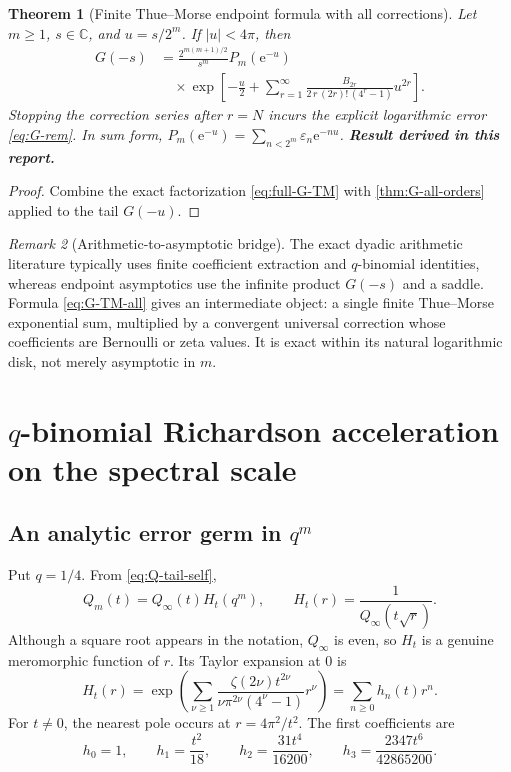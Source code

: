 \documentclass[11pt,oneside]{article}
\numberwithin{equation}{section}
\newtheorem{theorem}{Theorem}[section]
\theoremstyle{definition}
\theoremstyle{remark}
\newtheorem{remark}[theorem]{Remark}
\newcommand{\C}{\mathbb C}
\newcommand{\e}{\mathrm e}
\newcommand{\eps}{\varepsilon}
\newcommand{\newresult}{\textbf{Result derived in this report.}}
\begin{document}
\begin{theorem}[Finite Thue--Morse endpoint formula with all corrections]
\label{thm:G-TM-all}
Let $m\ge1$, $s\in\C$, and $u=s/2^m$.  If $|u|<4\pi$, then
\begin{equation}
 \boxed{
 \begin{aligned}
 G(-s)
 &=\frac{2^{m(m+1)/2}}{s^m}P_m(\e^{-u})\\
 &\quad\times
 \exp\!\left[-\frac{u}{2}
 +\sum_{r=1}^{\infty}
 \frac{B_{2r}}{2\,r\,(2r)!\,(4^r-1)}u^{2r}\right].
 \end{aligned}}
 \label{eq:G-TM-all}
\end{equation}
Stopping the correction series after $r=N$ incurs the explicit logarithmic error
\eqref{eq:G-rem}.  In sum form, $P_m(\e^{-u})=\sum_{n<2^m}\eps_n\e^{-nu}$.
\newresult
\end{theorem}

\begin{proof}
Combine the exact factorization \eqref{eq:full-G-TM} with
\cref{thm:G-all-orders} applied to the tail $G(-u)$.
\end{proof}

\begin{remark}[Arithmetic-to-asymptotic bridge]
The exact dyadic arithmetic literature typically uses finite coefficient extraction and
$q$-binomial identities, whereas endpoint asymptotics use the infinite product $G(-s)$ and a
saddle.  Formula \eqref{eq:G-TM-all} gives an intermediate object: a single finite
Thue--Morse exponential sum, multiplied by a convergent universal correction whose
coefficients are Bernoulli or zeta values.  It is exact within its natural logarithmic disk,
not merely asymptotic in $m$.
\end{remark}

\section{$q$-binomial Richardson acceleration on the spectral scale}
\label{sec:richardson}

\subsection{An analytic error germ in $q^m$}

Put $q=1/4$.  From \eqref{eq:Q-tail-self},
\begin{equation}
 Q_m(t)=Q_\infty(t)H_t(q^m),
 \qquad
 H_t(r)=\frac{1}{Q_\infty(t\sqrt r)}.
 \label{eq:Hdef}
\end{equation}
Although a square root appears in the notation, $Q_\infty$ is even, so $H_t$ is a genuine
meromorphic function of $r$.  Its Taylor expansion at $0$ is
\begin{equation}
 H_t(r)=\exp\!\left(\sum_{\nu\ge1}
 \frac{\zeta(2\nu)t^{2\nu}}{\nu\pi^{2\nu}(4^\nu-1)}r^\nu\right)
 =\sum_{n\ge0}h_n(t)r^n.
 \label{eq:Hseries}
\end{equation}
For $t\ne0$, the nearest pole occurs at $r=4\pi^2/t^2$.  The first coefficients are
\begin{equation}
 h_0=1,\qquad h_1=\frac{t^2}{18},\qquad
 h_2=\frac{31t^4}{16200},\qquad
 h_3=\frac{2347t^6}{42865200}.
 \label{eq:hfirst}
\end{equation}
\end{document}
